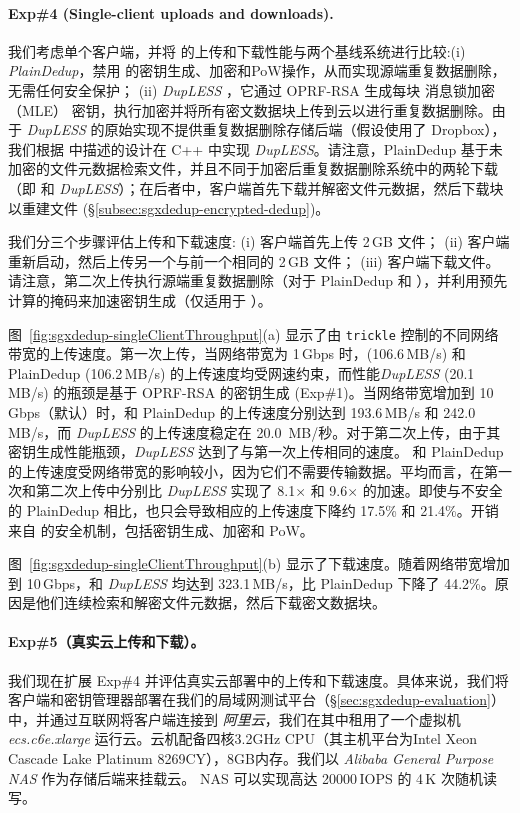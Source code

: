 \paragraph*{Exp\#4 (Single-client uploads and downloads).} 我们考虑单个客户端，并将 \sysnameS 的上传和下载性能与两个基线系统进行比较:(i) \textit{ PlainDedup}，禁用 \sysnameS 的密钥生成、加密和PoW操作，从而实现源端重复数据删除，无需任何安全保护； (ii) \textit{ {\em DupLESS}} \cite{bellare13b}，它通过 OPRF-RSA 生成每块 消息锁加密（MLE） 密钥，执行加密并将所有密文数据块上传到云以进行重复数据删除。由于 {\em DupLESS} 的原始实现不提供重复数据删除存储后端（假设使用了 Dropbox），我们根据 \cite{bellare13b} 中描述的设计在 C++ 中实现 {\em DupLESS}。请注意，PlainDedup 基于未加密的文件元数据检索文件，并且不同于加密后重复数据删除系统中的两轮下载（即 \sysnameS 和 {\em DupLESS}）；在后者中，客户端首先下载并解密文件元数据，然后下载块以重建文件 (\S\ref{subsec:sgxdedup-encrypted-dedup})。

我们分三个步骤评估上传和下载速度: (i) 客户端首先上传 2\,GB 文件； (ii) 客户端重新启动，然后上传另一个与前一个相同的 2\,GB 文件； (iii) 客户端下载文件。请注意，第二次上传执行源端重复数据删除（对于 PlainDedup 和 \sysnameS），并利用预先计算的掩码来加速密钥生成（仅适用于 \sysnameS）。

图~\ref{fig:sgxdedup-singleClientThroughput}(a) 显示了由 {\tt trickle} \cite{eriksen05} 控制的不同网络带宽的上传速度。第一次上传，当网络带宽为 1\,Gbps 时，\sysnameS (106.6\,MB/s) 和 PlainDedup (106.2\,MB/s) 的上传速度均受网速约束，而性能{\em DupLESS} (20.1\,MB/s) 的瓶颈是基于 OPRF-RSA 的密钥生成 (Exp\#1)。当网络带宽增加到 10\,Gbps（默认）时，\sysnameS 和 PlainDedup 的上传速度分别达到 193.6\,MB/s 和 242.0\,MB/s，而 {\em DupLESS} 的上传速度稳定在 20.0\, MB/秒。对于第二次上传，由于其密钥生成性能瓶颈，{\em DupLESS} 达到了与第一次上传相同的速度。 \sysnameS 和 PlainDedup 的上传速度受网络带宽的影响较小，因为它们不需要传输数据。平均而言，\sysnameS 在第一次和第二次上传中分别比 {\em DupLESS} 实现了 8.1$\times$ 和 9.6$\times$ 的加速。即使与不安全的 PlainDedup 相比，\sysnameS 也只会导致相应的上传速度下降约 17.5\% 和 21.4\%。开销来自 \sysnameS 的安全机制，包括密钥生成、加密和 PoW。

图~\ref{fig:sgxdedup-singleClientThroughput}(b) 显示了下载速度。随着网络带宽增加到 10\,Gbps，\sysnameS 和 {\em DupLESS} 均达到 323.1\,MB/s，比 PlainDedup 下降了 44.2\%。原因是他们连续检索和解密文件元数据，然后下载密文数据块。

\paragraph*{Exp\#5（真实云上传和下载）。} 我们现在扩展 Exp\#4 并评估真实云部署中的上传和下载速度。具体来说，我们将客户端和密钥管理器部署在我们的局域网测试平台（\S\ref{sec:sgxdedup-evaluation}）中，并通过互联网将客户端连接到\textit{ 阿里云}，我们在其中租用了一个虚拟机\textit{ ecs.c6e.xlarge} 运行云。云机配备四核3.2GHz CPU（其主机平台为Intel Xeon Cascade Lake Platinum 8269CY），8GB内存。我们以 \textit{ Alibaba General Purpose NAS} 作为存储后端来挂载云。 NAS 可以实现高达 20000\,IOPS 的 4\,K 次随机读写。

